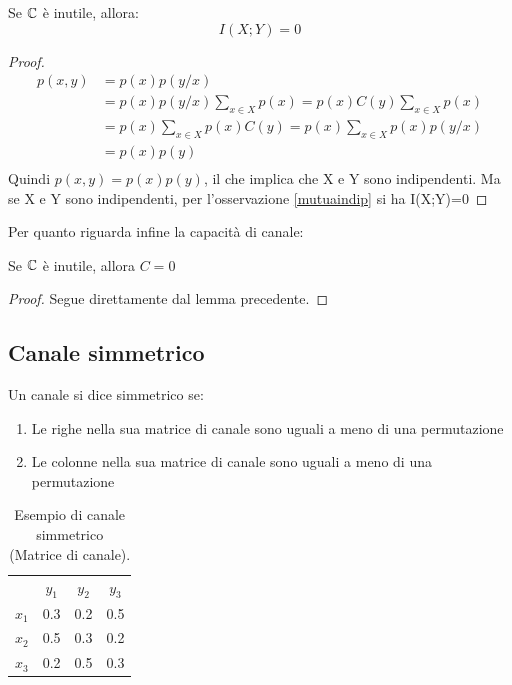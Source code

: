 \begin{lemma}
 Se $\mathbb{C}$ è inutile, allora:
\[
  I(X;Y)=0
\]
 \begin{proof}
\[\begin{split}
 p(x,y)&=p(x)p(y/x) \\
       &=p(x)p(y/x)\sum_{x \in X}p(x) 
       =p(x)C(y)\sum_{x \in X}p(x) \\
       &=p(x) \sum_{x \in X}p(x)C(y)
       =p(x) \sum_{x \in X}p(x)p(y/x)\\
       &=p(x) p(y) \\
  \end{split}
\]
Quindi $p(x,y)=p(x)p(y)$, il che implica che X e Y sono indipendenti.
Ma se X e Y sono indipendenti, per l'osservazione \ref{mutuaindip} si ha I(X;Y)=0
 \end{proof}
\end{lemma}

\noindent
Per quanto riguarda infine la capacità di canale:

\begin{lemma}
Se $\mathbb{C}$ è inutile, allora $C=0$
\begin{proof}
Segue direttamente dal lemma precedente.
\end{proof}
\end{lemma}

\subsection{Canale simmetrico}

\medskip

\begin{definizione}
 Un canale si dice simmetrico se:
 \begin{enumerate}
  \item Le righe nella sua matrice di canale sono uguali a meno di una permutazione
  \item Le colonne nella sua matrice di canale sono uguali a meno di una permutazione
 \end{enumerate}
\end{definizione}


\begin{table}[htbp]
  \begin{center}
   \begin{tabular}{c c c c}
	& $y_1$ & $y_2$ & $y_3$ \\
	$x_1$ & 0.3 & 0.2 & 0.5 \\ 
	$x_2$ & 0.5 & 0.3 & 0.2  \\ 
	$x_3$ & 0.2 & 0.5 & 0.3  \\ 
    \end{tabular}
  \caption{Esempio di canale simmetrico (Matrice di canale).}
  \label{tab:tsim}
  \end{center}
\end{table}

